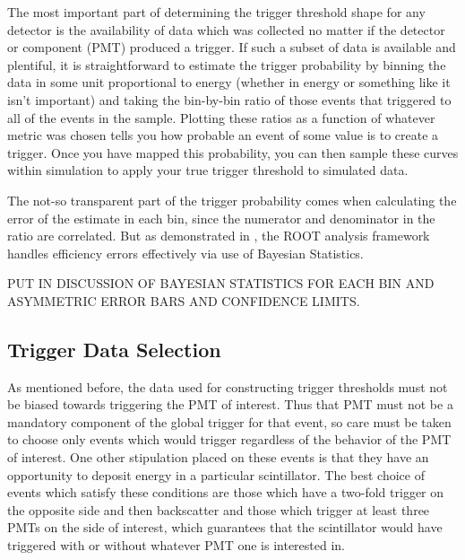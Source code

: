 The most important part of determining the trigger threshold shape for 
any detector is the availability of data which was collected no matter if 
the detector or component (PMT) produced a trigger. If such a subset of 
data is available and plentiful, it is straightforward to estimate
the trigger probability by binning the data in some unit proportional to 
energy (whether in energy or something like it isn't important) and taking 
the bin-by-bin ratio of those events that triggered to all of the events in the 
sample. Plotting these ratios as a function of whatever metric was chosen tells 
you how probable an event of some value is to create a trigger.
Once you have mapped this probability, you can then sample these curves within 
simulation to apply your true trigger threshold to simulated data.

The not-so transparent part of the trigger probability comes when calculating the error of the estimate in each bin, since the numerator and denominator in the ratio are correlated. But as demonstrated in \cite{casadei2009efficiency}, the ROOT analysis framework handles efficiency errors effectively via use of Bayesian Statistics. 

PUT IN DISCUSSION OF BAYESIAN STATISTICS FOR EACH BIN AND ASYMMETRIC ERROR BARS
AND CONFIDENCE LIMITS.

\subsection{Trigger Data Selection}
As mentioned before, the data used for constructing trigger thresholds must not be 
biased towards triggering the PMT of interest. Thus that PMT must not be a mandatory 
component of the global trigger for that event, so care must be taken to choose only 
events which would trigger regardless of the behavior of the PMT of interest. One
other stipulation placed on these events is that they have an opportunity to 
deposit energy in a particular scintillator. The best choice of events which 
satisfy these conditions are those which have a two-fold trigger on the opposite side 
and then backscatter and those which trigger at least three PMTs on the side of 
interest, which guarantees that the scintillator would have triggered with or without 
whatever PMT one is interested in.	

